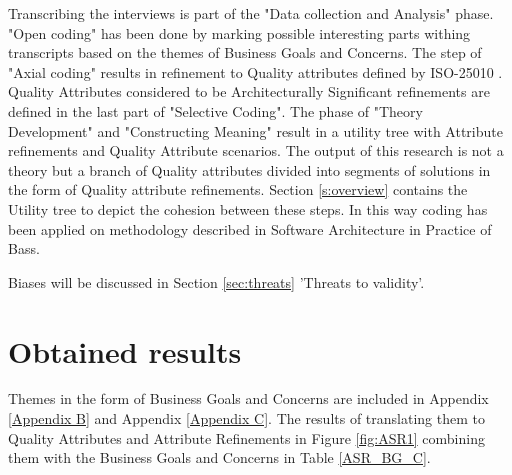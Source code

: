 Transcribing the interviews is part of the "Data collection and Analysis" phase. "Open coding" has been done by marking possible interesting parts withing transcripts based on the themes of Business Goals and Concerns. The step of "Axial coding" results in refinement to Quality attributes defined by ISO-25010 \cite{ISO:25010:2011}. Quality Attributes considered to be Architecturally Significant refinements are defined in the last part of "Selective Coding". The phase of "Theory Development" and "Constructing Meaning" result in a utility tree with Attribute refinements and Quality Attribute scenarios. The output of this research is not a theory but a branch of Quality attributes divided into segments of solutions in the form of Quality attribute refinements.  Section \ref{s:overview} contains the Utility tree to depict the cohesion between these steps. In this way coding has been applied on methodology described in Software Architecture in Practice of Bass\etal \cite{Bass2015SoftwareAI}.

Biases will be discussed in Section \ref{sec:threats} 'Threats to validity'.

\section{Obtained results}
Themes in the form of Business Goals and Concerns are included in Appendix \ref{Appendix B} and Appendix \ref{Appendix C}. The results of translating them to Quality Attributes and Attribute Refinements in Figure \ref{fig:ASR1} combining them with the Business Goals and Concerns in Table \ref{ASR_BG_C}.




